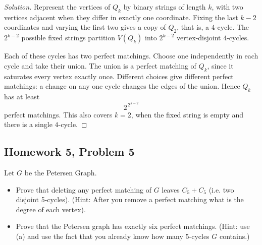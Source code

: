 \documentclass[12pt]{amsart}
\newenvironment{solution}{\begin{proof}[Solution]}{\end{proof}}
\begin{document}
    \begin{solution}
        Represent the vertices of $Q_k$ by binary strings of length
        $k$, with two vertices adjacent when they differ in exactly
        one coordinate. Fixing the last $k-2$ coordinates and varying
        the first two gives a copy of $Q_2$, that is, a $4$-cycle.
        The $2^{k-2}$ possible fixed strings partition $V(Q_k)$ into
        $2^{k-2}$ vertex-disjoint $4$-cycles.

        Each of these cycles has two perfect matchings. Choose one
        independently in each cycle and take their union. The union
        is a perfect matching of $Q_k$, since it saturates every
        vertex exactly once. Different choices give different
        perfect matchings: a change on any one cycle changes the
        edges of the union. Hence $Q_k$ has at least
        \[
            2^{\,2^{k-2}}
        \]
        perfect matchings. This also covers $k=2$, when the fixed
        string is empty and there is a single $4$-cycle.
    \end{solution}

    \subsection*{Homework 5, Problem 5} Let $G$ be the Petersen Graph.
    \begin{itemize}
        \item[(a)] Prove that deleting any perfect matching of $G$ leaves $C_5 + C_5$ (i.e. two disjoint 5-cycles).
        (Hint: After you remove a perfect matching what is the degree of each vertex).
        \item[(b)] Prove that the Petersen graph has exactly six perfect matchings.
        (Hint: use (a) and use the fact that you already know how many 5-cycles $G$ contains.)
    \end{itemize}
\end{document}
